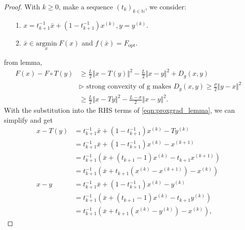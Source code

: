     \begin{proof}\label{proof:vfist-convergence-prep}
        With $k\ge 0$, make a sequence $(t_k)_{k\in \mathbb N}$, we consider:
        \begin{itemize}
            \item [1.] $x = t^{-1}_{k + 1}\bar x + (1 - t^{-1}_{k + 1})x^{(k)}, y = y^{(k)}$. 
            \item [2.] $\bar x \in \underset{x}{\text{argmin}}\; F(x)$ and $f(\bar x) = F_{\text{opt}}$. 
        \end{itemize}
        from lemma,
        \begin{align}
            F(x) - F\circ T(y) &\ge 
            \frac{L}{2}\Vert x - T (y)\Vert^2 - \frac{L}{2}\Vert x - y\Vert^2 + D_g(x, y)
            \\
            & \triangleright \text{ strong convexity of g makes }
            D_g(x, y) \ge \frac{\sigma}{2}\Vert y - x\Vert^2
            \\
            & \ge \frac{L}{2}\Vert x - Ty\Vert^2 - \frac{L - \sigma}{2}\Vert x - y\Vert^2. 
        \end{align}\label{eqn:proxgrad_lemma}
        With the substitution into the RHS terms of \hyperref[eqn:proxgrad_lemma]{\ref*{eqn:proxgrad_lemma}}, we can simplify and get
        \begin{align*}
            x - T(y) &=  t^{-1}_{k+1} \bar x + (1 - t^{-1}_{k+1}) x^{(k)} - T y^{(k)}
            \\
            &= t^{-1}_{k+1} \bar x + (1 - t^{-1}_{k+1}) x^{(k)} - x^{(k + 1)}
            \\
            &= t^{-1}_{k + 1}\left(
                \bar x + (t_{k+1} - 1)x^{(k)} - t_{k+1}x^{(k + 1)}
            \right)
            \\
            &= t^{-1}_{k + 1} \left(
                \bar x + t_{k+1} \left(
                    x^{(k)} - x^{(k + 1)}
                \right) - x^{(k)}
            \right)
            \\
            x - y &= t^{-1}_{k+1} \bar x + (1 - t_{k+1}^{-1}) x^{(k)} - y^{(k)}
            \\
            &= t^{-1}_{k + 1}\left(
                \bar x + (t_{k+1} - 1)x^{(k)} - t_{k+1} y^{(k)}
            \right)
            \\
            &= t^{-1}_{k + 1}
            \left(
                \bar x + t_{k+1} \left(
                    x^{(k)} - y^{(k)}
                \right) - x^{(k)}
            \right), 
        \end{align*}

\end{proof}
